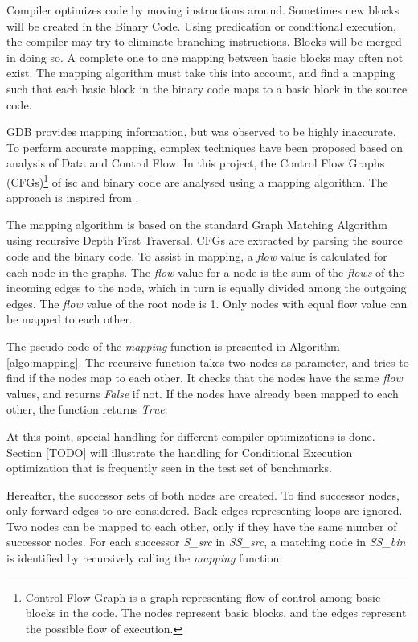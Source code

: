 Compiler optimizes code by moving instructions around. Sometimes new blocks will be created in the Binary Code. Using predication or conditional execution, the compiler may try to eliminate branching instructions. Blocks will be merged in doing so. A complete one to one mapping between basic blocks may often not exist. The mapping algorithm must take this into account, and find a mapping such that each basic block in the binary code maps to a basic block in the source code.

GDB provides mapping information, but was observed to be highly inaccurate. To perform accurate mapping, complex techniques have been proposed based on analysis of Data and Control Flow. In this project, the Control Flow Graphs (CFGs)\footnote{Control Flow Graph is a graph representing flow of control among basic blocks in the code. The nodes represent basic blocks, and the edges represent the possible flow of execution.} of \gls{isc} and binary code are analysed using a mapping algorithm. The approach is inspired from \cite{RBA2013}.

The mapping algorithm is based on the standard Graph Matching Algorithm using recursive Depth First Traversal. CFGs are extracted by parsing the source code and the binary code. To assist in mapping, a \textit{flow} value is calculated for each node in the graphs. The \textit{flow} value for a node is the sum of the \textit{flows} of the incoming edges to the node, which in turn is equally divided among the outgoing edges. The \textit{flow} value of the root node is 1. Only nodes with equal flow value can be mapped to each other.

The pseudo code of the \emph{mapping} function is presented in Algorithm \ref{algo:mapping}. The recursive function takes two nodes as parameter, and tries to find if the nodes map to each other. It checks that the nodes have the same \textit{flow} values, and returns \textit{False} if not. If the nodes have already been mapped to each other, the function returns \textit{True}. 

At this point, special handling for different compiler optimizations is done. Section [TODO] will illustrate the handling for Conditional Execution optimization that is frequently seen in the test set of benchmarks.

Hereafter, the successor sets of both nodes are created. To find successor nodes, only forward edges to are considered. Back edges representing loops are ignored. Two nodes can be mapped to each other, only if they have the same number of successor nodes. For each successor \emph{S\_src} in \emph{SS\_src}, a matching node in \emph{SS\_bin} is identified by recursively calling the \emph{mapping} function. 

